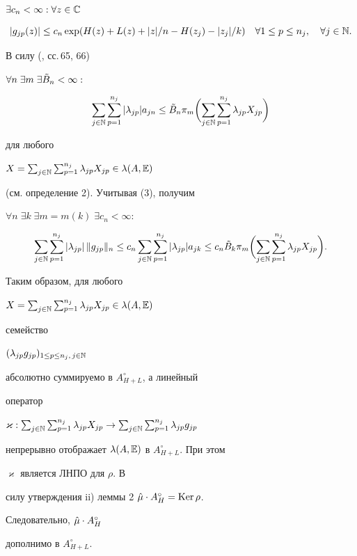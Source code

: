 \begin{pf}
$\exists c_n<\infty :\forall z\in\Bbb C$ 


%


\begin{equation} 


|g_{jp}(z)|\le c_n\exp(H(z)+L(z)+|z|/n-H(z_j)-|z_j|/k) 


\quad \forall 1\le p\le n_j,\quad \forall j\in\Bbb N. 


\end{equation} 


%


В силу (\cite{Mei2}, сс.\,65, 66) 


$\forall n\; \exists m\;\exists \Tilde B_n<\infty :$ 


$$ 


\sum_{j\in\Bbb N}\sum_{p=1}^{n_j}|\lambda_{jp}|a_{jn}\le 


\Tilde B_n \pi_m\biggl(\sum_{j\in\Bbb N}\sum_{p=1}^{n_j} 


\lambda_{jp}X_{jp}\biggr) 


$$ 


для любого 


$X=\sum_{j\in\Bbb N}\sum_{p=1}^{n_j}\lambda_{jp}X_{jp}\in\lambda(A,\Bbb E)$ 


(см. определение 2). Учитывая (3), получим 


$\forall n\;\exists k\;\exists m=m(k)\;\exists c_n<\infty :$ 


$$ 


\sum_{j\in\Bbb N}\sum_{p=1}^{n_j}|\lambda_{jp}| \, \|g_{jp}\|_n \le 


c_n\sum_{j\in\Bbb N}\sum_{p=1}^{n_j}|\lambda_{jp}|a_{jk} \le 


c_n\Tilde B_k \pi_m\biggl( 


\sum_{j\in\Bbb N}\sum_{p=1}^{n_j}\lambda_{jp}X_{jp}\biggr). 


$$ 


Таким образом, для любого 


$X=\sum_{j\in\Bbb N}\sum_{p=1}^{n_j}\lambda_{jp}X_{jp}\in\lambda(A,\Bbb E)$ 


семейство 


$(\lambda_{jp}g_{jp})_{1\le p\le n_j,\,j\in\Bbb N}$ 


абсолютно суммируемо в $A^\circ_{H+L}$, а линейный 


оператор 


$\varkappa :\sum_{j\in\Bbb N}\sum_{p=1}^{n_j}\lambda_{jp}X_{jp}\to 


\sum_{j\in\Bbb N}\sum_{p=1}^{n_j}\lambda_{jp}g_{jp}$


непрерывно отображает $\lambda(A,\Bbb E)$ в $A^\circ_{H+L}$. При этом 


$\varkappa$ является ЛНПО для $\rho$. В 


силу утверждения ii) леммы 2 $\Hat\mu\cdot A^\circ_H=\operatorname{Ker}\rho$. 


Следовательно, $\Hat\mu\cdot A^\circ_H$


дополнимо в $A^\circ_{H+L}$. 


\end{pf} 


